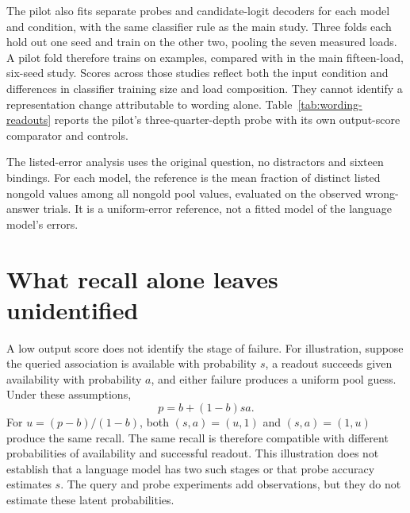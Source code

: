 \documentclass{article}
\begin{document}
The pilot also fits separate probes and candidate-logit decoders for each model and condition, with the same classifier rule as the main study.
Three folds each hold out one seed and train on the other two, pooling the seven measured loads.
A pilot fold therefore trains on \NewPilotTrain{} examples, compared with \NewMainTrain{} in the main fifteen-load, six-seed study.
Scores across those studies reflect both the input condition and differences in classifier training size and load composition.
They cannot identify a representation change attributable to wording alone.
Table~\ref{tab:wording-readouts} reports the pilot's three-quarter-depth probe with its own output-score comparator and controls.

\begin{table}[t]
\centering
\caption{Exploratory pilot readouts at sixteen bindings, with 288 out-of-fold predictions per condition.
Probe: full-pool prediction from three-quarter depth.
Logit dec.: trained full-pool candidate-logit decoder.
Foil: listed-value recall when predicting the next listed entity's value.
Shuffled: pool recall after shuffling the training labels.
These columns use different chance baselines; the listed-value guess is approximately 0.076 and pool chance is approximately 0.014 to 0.015.
These descriptive estimates are not used to decide whether the held-out test passes.}
\label{tab:wording-readouts}
\small

\end{table}

The listed-error analysis uses the original question, no distractors and sixteen bindings.
For each model, the reference is the mean fraction of distinct listed nongold values among all nongold pool values, evaluated on the observed wrong-answer trials.
It is a uniform-error reference, not a fitted model of the language model's errors.

\section{What recall alone leaves unidentified}\label{app:identity}
A low output score does not identify the stage of failure.
For illustration, suppose the queried association is available with probability $s$, a readout succeeds given availability with probability $a$, and either failure produces a uniform pool guess.
Under these assumptions,
\begin{equation}
p=b+(1-b)sa.
\label{eq:storage-access}
\end{equation}
For $u=(p-b)/(1-b)$, both $(s,a)=(u,1)$ and $(s,a)=(1,u)$ produce the same recall.
The same recall is therefore compatible with different probabilities of availability and successful readout.
This illustration does not establish that a language model has two such stages or that probe accuracy estimates $s$.
The query and probe experiments add observations, but they do not estimate these latent probabilities.
\end{document}
